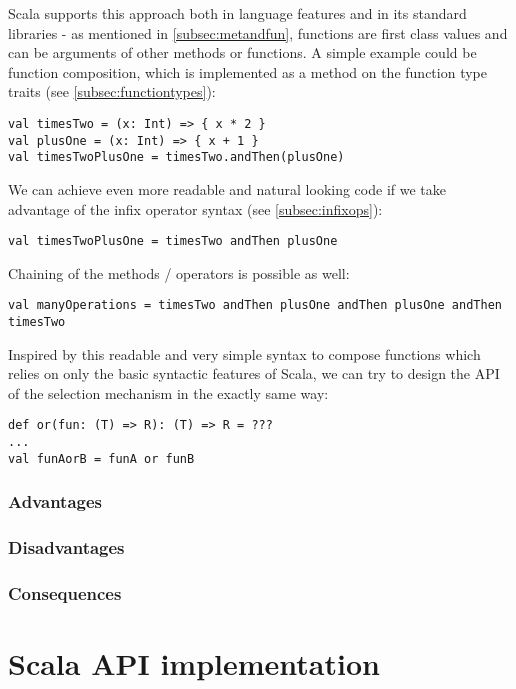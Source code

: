 Scala supports this approach both in language features and in its standard libraries - as mentioned in \ref{subsec:metandfun}, functions are first class values and can be arguments of other methods or functions. A simple example could be function composition, which is implemented as a method on the function type traits (see \ref{subsec:functiontypes}):

\lstset{style=Scala}
\begin{lstlisting}
val timesTwo = (x: Int) => { x * 2 }
val plusOne = (x: Int) => { x + 1 }
val timesTwoPlusOne = timesTwo.andThen(plusOne)
\end{lstlisting}

We can achieve even more readable and natural looking code if we take advantage of the infix operator syntax (see \ref{subsec:infixops}):

\lstset{style=Scala}
\begin{lstlisting}
val timesTwoPlusOne = timesTwo andThen plusOne
\end{lstlisting}

Chaining of the methods / operators is possible as well:

\lstset{style=Scala}
\begin{lstlisting}
val manyOperations = timesTwo andThen plusOne andThen plusOne andThen timesTwo
\end{lstlisting}

Inspired by this readable and very simple syntax to compose functions which relies on only the basic syntactic features of Scala, we can try to design the API of the selection mechanism in the exactly same way:

\lstset{style=Scala}
\begin{lstlisting}
def or(fun: (T) => R): (T) => R = ???
...
val funAorB = funA or funB
\end{lstlisting}

\subsubsection{Advantages}
\subsubsection{Disadvantages}
\subsubsection{Consequences}

\section{Scala API implementation}

